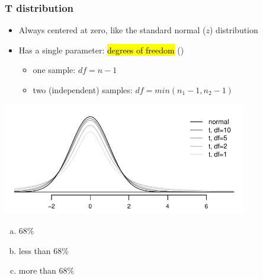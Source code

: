 \documentclass[11pt,containsverbatim,handout,xcolor=xelatex,dvipsnames,table]{beamer}
\newcommand{\solnMult}[1]{#1}
\newcommand{\soln}[1]{}
\begin{document}

\begin{frame}
\frametitle{T distribution}

\begin{itemize}

\item Always centered at zero, like the standard normal ($z$) distribution

\pause

\item Has a single parameter: \hl{degrees of freedom} ()
\begin{itemize}
\item one sample: $df = n - 1$
\item two (independent) samples: $df = min(n_1 - 1, n_2 - 1)$
\end{itemize}

\end{itemize}

\begin{center}
\includegraphics[width=0.8\textwidth]{figures/tDistConvergeToNormalDist/tDistConvergeToNormalDist}
\end{center}

\pause


\soln{\pause Approaches normal.}

\end{frame}


\begin{frame}


\begin{enumerate}[(a)]
\item 68\%
\item \solnMult{less than 68\%}
\item more than 68\%
\end{enumerate}

\end{frame}
\end{document}
